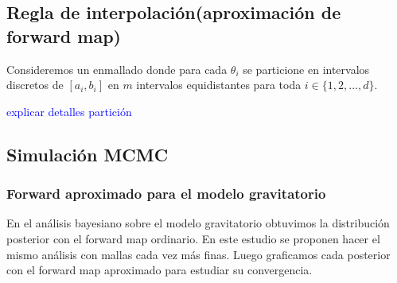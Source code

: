 \subsection{Regla de interpolación(aproximación de forward map)}

Consideremos un enmallado donde para cada $\theta_i$ se particione en intervalos discretos de $[a_i,b_i]$ en $m$ intervalos equidistantes para toda $i \in \{1,2,...,d\}.$ 

\textcolor{blue}{explicar detalles partición}



\subsection{Simulación MCMC}
\subsubsection{Forward aproximado para el modelo gravitatorio}

En el análisis bayesiano sobre el modelo gravitatorio obtuvimos la distribución posterior con el forward map ordinario. En este estudio se proponen hacer el mismo análisis con mallas cada vez más finas. Luego graficamos cada posterior con el forward map aproximado para estudiar su convergencia.



